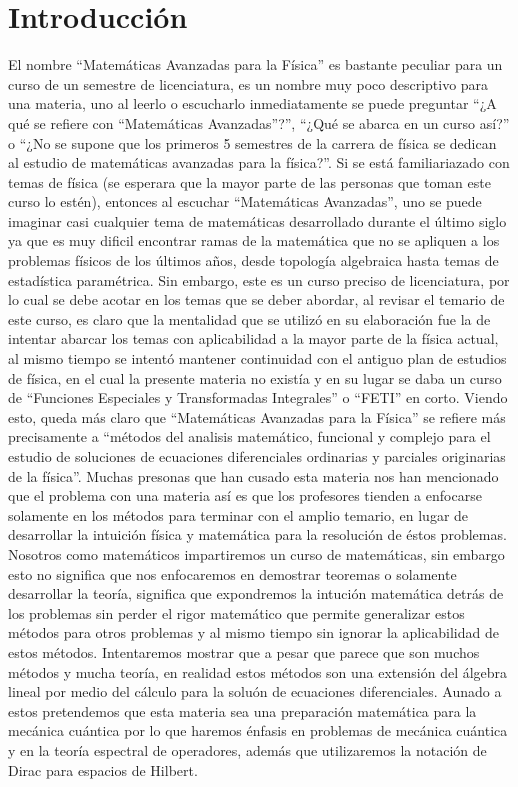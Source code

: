 \documentclass[main.tex]{subfiles}
\begin{document}
\chapter{Introducción}

\noindent El nombre ``Matemáticas Avanzadas para la Física'' es bastante peculiar para un curso de un semestre de licenciatura, es un nombre muy poco descriptivo para una materia, uno al leerlo o escucharlo inmediatamente se puede preguntar ``¿A qué se refiere con ``Matemáticas Avanzadas''?'', ``¿Qué se abarca en un curso así?'' o ``¿No se supone que los primeros 5 semestres de la carrera de física se dedican al estudio de matemáticas avanzadas para la física?''. Si se está familiariazado con temas de física (se esperara que la mayor parte de las personas que toman este curso lo estén), entonces al escuchar ``Matemáticas Avanzadas'', uno se puede imaginar casi cualquier tema de matemáticas desarrollado durante el último siglo ya que es muy dificil encontrar ramas de la matemática que no se apliquen a los problemas físicos de los últimos años, desde topología algebraica hasta temas de estadística paramétrica.
Sin embargo, este es un curso preciso de licenciatura, por lo cual se debe acotar en los temas que se deber abordar, al revisar el temario de este curso, es claro que la mentalidad que se utilizó en su elaboración fue la de intentar abarcar los temas con aplicabilidad a la mayor parte de la física actual, al mismo tiempo se intentó mantener continuidad con el antiguo plan de estudios de física, en el cual la presente materia no existía y en su lugar se daba un curso de ``Funciones Especiales y Transformadas Integrales'' o ``FETI'' en corto. Viendo esto, queda más claro que ``Matemáticas Avanzadas para la Física'' se refiere más precisamente a ``métodos del analisis matemático, funcional y complejo para el estudio de soluciones de ecuaciones diferenciales ordinarias y parciales originarias de la física''.
Muchas presonas que han cusado esta materia nos han mencionado que el problema con una materia así es que los profesores tienden a enfocarse solamente en los métodos para terminar con el amplio temario, en lugar de desarrollar la intuición física y matemática para la resolución de éstos problemas. Nosotros como matemáticos impartiremos un curso de matemáticas, sin embargo esto no significa que nos enfocaremos en demostrar teoremas o solamente desarrollar la teoría, significa que expondremos la intución matemática detrás de los problemas sin perder el rigor matemático que permite generalizar estos métodos para otros problemas y al mismo tiempo sin ignorar la aplicabilidad de estos métodos. Intentaremos mostrar que a pesar que parece que son muchos métodos y mucha teoría, en realidad estos métodos son una extensión del álgebra lineal por medio del cálculo para la soluón de ecuaciones diferenciales. Aunado a estos pretendemos que esta materia sea una preparación matemática para la mecánica cuántica por lo que haremos énfasis en problemas de mecánica cuántica y en la teoría espectral de operadores, además que utilizaremos la notación de Dirac para espacios de Hilbert.\\
\end{document}
